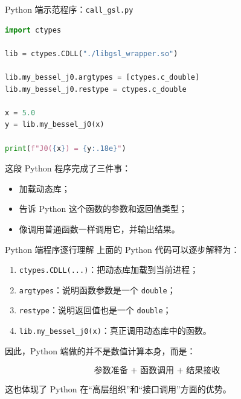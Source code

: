 \documentclass[aspectratio=169,11pt]{ctexbeamer}
\begin{document}
\begin{frame}[fragile]{Python 端示范程序：\texttt{call\_gsl.py}}
\begin{lstlisting}[language=Python]
import ctypes

lib = ctypes.CDLL("./libgsl_wrapper.so")

lib.my_bessel_j0.argtypes = [ctypes.c_double]
lib.my_bessel_j0.restype = ctypes.c_double

x = 5.0
y = lib.my_bessel_j0(x)

print(f"J0({x}) = {y:.18e}")
\end{lstlisting}

\vspace{0.5em}
这段 Python 程序完成了三件事：

\begin{itemize}
  \item 加载动态库；
  \item 告诉 Python 这个函数的参数和返回值类型；
  \item 像调用普通函数一样调用它，并输出结果。
\end{itemize}
\end{frame}

\begin{frame}{Python 端程序逐行理解}
上面的 Python 代码可以逐步解释为：

\begin{enumerate}
  \item \texttt{ctypes.CDLL(...)}：把动态库加载到当前进程；
  \item \texttt{argtypes}：说明函数参数是一个 \texttt{double}；
  \item \texttt{restype}：说明返回值也是一个 \texttt{double}；
  \item \texttt{lib.my\_bessel\_j0(x)}：真正调用动态库中的函数。
\end{enumerate}

\vspace{0.5em}
因此，Python 端做的并不是数值计算本身，而是：

\[
\boxed{\text{参数准备 + 函数调用 + 结果接收}}
\]

这也体现了 Python 在“高层组织”和“接口调用”方面的优势。
\end{frame}
\end{document}
